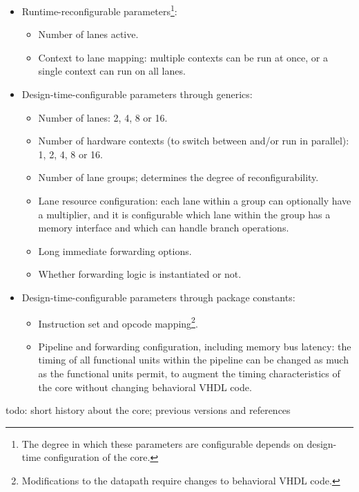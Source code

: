 \documentclass[10pt]{article}
\begin{document}
\begin{itemize}
  
  \item Runtime-reconfigurable parameters\footnote{The degree in which these parameters are configurable depends on design-time configuration of the core.}:
  \begin{itemize}
    \item Number of lanes active.
    \item Context to lane mapping: multiple contexts can be run at once, or a single context can run on all lanes.
  \end{itemize}
  
  \item Design-time-configurable parameters through generics:
  \begin{itemize}
    \item Number of lanes: 2, 4, 8 or 16.
    \item Number of hardware contexts (to switch between and/or run in parallel): 1, 2, 4, 8 or 16.
    \item Number of lane groups; determines the degree of reconfigurability.
    \item Lane resource configuration: each lane within a group can optionally have a multiplier, and it is configurable which lane within the group has a memory interface and which can handle branch operations.
    \item Long immediate forwarding options.
    \item Whether forwarding logic is instantiated or not.
  \end{itemize}
  
  \item Design-time-configurable parameters through package constants:
  \begin{itemize}
    \item Instruction set and opcode mapping\footnote{Modifications to the datapath require changes to behavioral VHDL code.}.
    \item Pipeline and forwarding configuration, including memory bus latency: the timing of all functional units within the pipeline can be changed as much as the functional units permit, to augment the timing characteristics of the core without changing behavioral VHDL code.
  \end{itemize}

\end{itemize}

todo: short history about the core; previous versions and references
\end{document}
